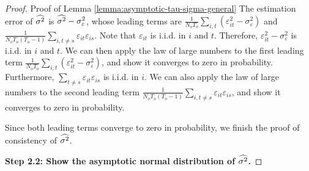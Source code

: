 \begin{proof}{Proof of Lemma \ref{lemma:asymptotic-tau-sigma-general}}
The estimation error of $\widehat{\sigma^2}$ is $\widehat{\sigma^2} - \sigma_\varepsilon^2$, whose leading terms are $\frac{1}{N_o T_o} \sum_{i,t} (\varepsilon_{it}^2 - \sigma_\varepsilon^2 )$ and $\frac{1}{N_o T_o(T_o-1)} \sum_{i, t\neq s} \varepsilon_{it} \varepsilon_{is} $. Note that $\varepsilon_{it}$ is i.i.d. in $i$ and $t$. Therefore, $\varepsilon_{it}^2 - \sigma_\varepsilon^2 $ is i.i.d. in $i$ and $t$. We can then apply the law of large numbers to the first leading term $\frac{1}{N_o T_o} \sum_{i,t} (\varepsilon_{it}^2 - \sigma_\varepsilon^2 )$, and show it converges to zero in probability. Furthermore, $\sum_{t\neq s} \varepsilon_{it} \varepsilon_{is}$ is i.i.d. in $i$. We can also apply the law of large numbers to the second leading term $\frac{1}{N_o T_o(T_o-1)} \sum_{i, t\neq s} \varepsilon_{it} \varepsilon_{is} $, and show it converges to zero in probability.

Since both leading terms converge to zero in probability, we finish the proof of consistency of $\widehat{\sigma^2}$.


\textbf{Step 2.2: Show the asymptotic normal distribution of $\widehat{\sigma^2}$.}


\end{proof}
